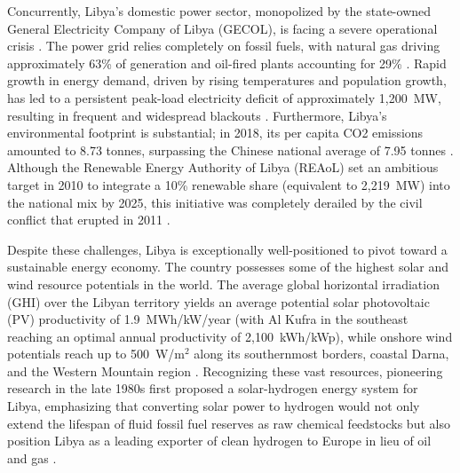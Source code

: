 \documentclass[preprint,12pt]{elsarticle}
\begin{document}
Concurrently, Libya's domestic power sector, monopolized by the state-owned General Electricity Company of Libya (GECOL), is facing a severe operational crisis \cite{almaktar2021prospects}. The power grid relies completely on fossil fuels, with natural gas driving approximately 63\% of generation and oil-fired plants accounting for 29\% \cite{almaktar2021prospects}. Rapid growth in energy demand, driven by rising temperatures and population growth, has led to a persistent peak-load electricity deficit of approximately 1,200~MW, resulting in frequent and widespread blackouts \cite{almaktar2021prospects}. Furthermore, Libya's environmental footprint is substantial; in 2018, its per capita CO2 emissions amounted to 8.73 tonnes, surpassing the Chinese national average of 7.95 tonnes \cite{almaktar2021prospects}. Although the Renewable Energy Authority of Libya (REAoL) set an ambitious target in 2010 to integrate a 10\% renewable share (equivalent to 2,219~MW) into the national mix by 2025, this initiative was completely derailed by the civil conflict that erupted in 2011 \cite{almaktar2021prospects}.

Despite these challenges, Libya is exceptionally well-positioned to pivot toward a sustainable energy economy. The country possesses some of the highest solar and wind resource potentials in the world. The average global horizontal irradiation (GHI) over the Libyan territory yields an average potential solar photovoltaic (PV) productivity of 1.9~MWh/kW/year (with Al Kufra in the southeast reaching an optimal annual productivity of 2,100~kWh/kWp), while onshore wind potentials reach up to 500~W/m$^2$ along its southernmost borders, coastal Darna, and the Western Mountain region \cite{almaktar2021prospects}. Recognizing these vast resources, pioneering research in the late 1980s first proposed a solar-hydrogen energy system for Libya, emphasizing that converting solar power to hydrogen would not only extend the lifespan of fluid fossil fuel reserves as raw chemical feedstocks but also position Libya as a leading exporter of clean hydrogen to Europe in lieu of oil and gas \cite{eljrushi1990solar}. 
\end{document}
